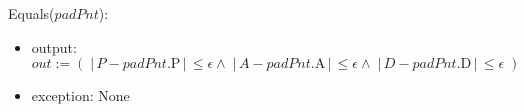 \noindent Equals($padPnt$):
\begin{itemize}

    \item output: $out := \left( \; | \, P - padPnt.\text{P} \, | \, \leq
    \epsilon \wedge \; | \, A - padPnt.\text{A} \, | \, \leq \epsilon \wedge \;
    | \, D - padPnt.\text{D} \, | \, \leq \epsilon \; \right)$

    \item exception: None

\end{itemize}
